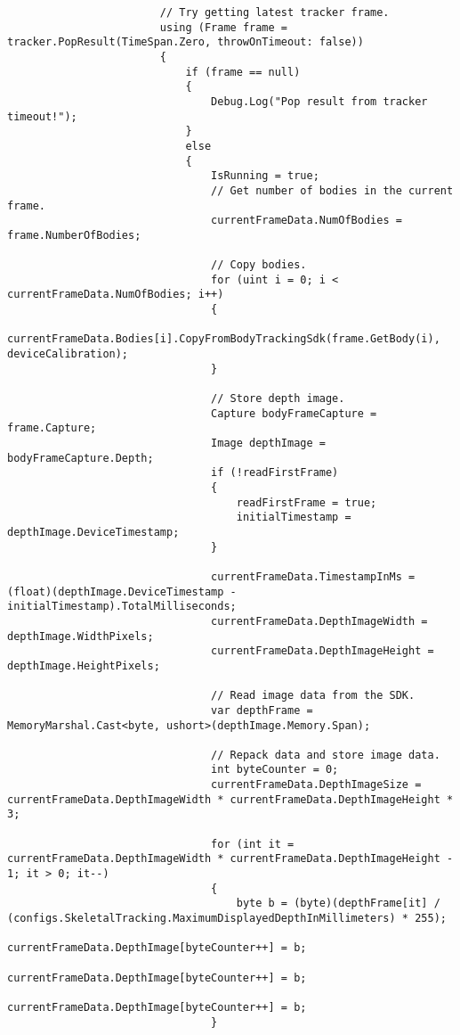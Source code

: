 \begin{verbatim}
                        // Try getting latest tracker frame.
                        using (Frame frame = tracker.PopResult(TimeSpan.Zero, throwOnTimeout: false))
                        {
                            if (frame == null)
                            {
                                Debug.Log("Pop result from tracker timeout!");
                            }
                            else
                            {
                                IsRunning = true;
                                // Get number of bodies in the current frame.
                                currentFrameData.NumOfBodies = frame.NumberOfBodies;

                                // Copy bodies.
                                for (uint i = 0; i < currentFrameData.NumOfBodies; i++)
                                {
                                    currentFrameData.Bodies[i].CopyFromBodyTrackingSdk(frame.GetBody(i), deviceCalibration);
                                }

                                // Store depth image.
                                Capture bodyFrameCapture = frame.Capture;
                                Image depthImage = bodyFrameCapture.Depth;
                                if (!readFirstFrame)
                                {
                                    readFirstFrame = true;
                                    initialTimestamp = depthImage.DeviceTimestamp;
                                }

                                currentFrameData.TimestampInMs = (float)(depthImage.DeviceTimestamp - initialTimestamp).TotalMilliseconds;
                                currentFrameData.DepthImageWidth = depthImage.WidthPixels;
                                currentFrameData.DepthImageHeight = depthImage.HeightPixels;

                                // Read image data from the SDK.
                                var depthFrame = MemoryMarshal.Cast<byte, ushort>(depthImage.Memory.Span);

                                // Repack data and store image data.
                                int byteCounter = 0;
                                currentFrameData.DepthImageSize = currentFrameData.DepthImageWidth * currentFrameData.DepthImageHeight * 3;

                                for (int it = currentFrameData.DepthImageWidth * currentFrameData.DepthImageHeight - 1; it > 0; it--)
                                {
                                    byte b = (byte)(depthFrame[it] / (configs.SkeletalTracking.MaximumDisplayedDepthInMillimeters) * 255);
                                    currentFrameData.DepthImage[byteCounter++] = b;
                                    currentFrameData.DepthImage[byteCounter++] = b;
                                    currentFrameData.DepthImage[byteCounter++] = b;
                                }


\end{verbatim}

